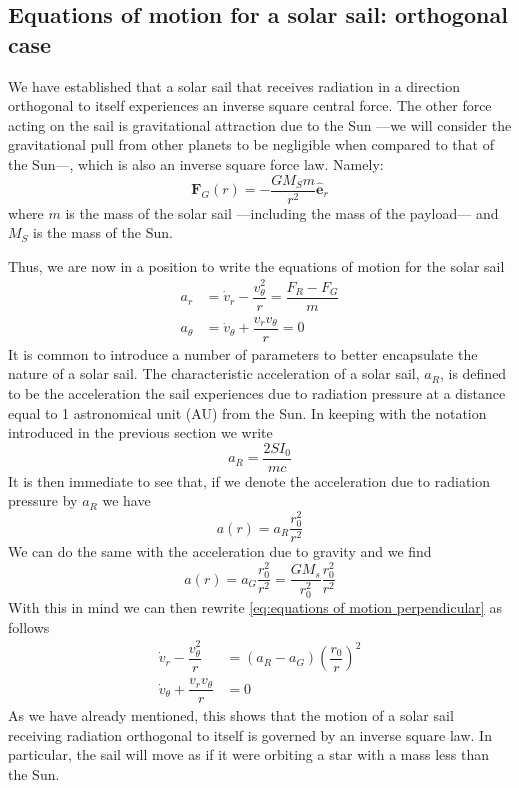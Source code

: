 \documentclass[twocolumn,12pt,a4paper]{article}
\numberwithin{equation}{section}
\begin{document}
\subsection{Equations of motion for a solar sail: orthogonal case}
We have established that a solar sail that receives radiation in a direction orthogonal to itself experiences an inverse square central force. The other force acting on the sail is gravitational attraction due to the Sun ---we will consider the gravitational pull from other planets to be negligible when compared to that of the Sun---, which is also an inverse square force law. Namely:
\begin{equation}
 	\mathbf{F}_G(r) = -\dfrac{G M_S m}{r^2} \mathbf{\hat{e}}_r \label{eq:gravitational force}
\end{equation}
where \( m \) is the mass of the solar sail ---including the mass of the payload--- and \( M_S \) is the mass of the Sun.

Thus, we are now in a position to write the equations of motion for the solar sail
\begin{align}
	a_{r} &= \dot{v}_r - \dfrac{v_{\theta}^2}{r} = \dfrac{F_R - F_G}{m} \label{eq:equations of motion perpendicular} \\
	a_{\theta} &= \dot{v}_{\theta} + \dfrac{v_r v_{\theta}}{r} = 0 
\end{align}
It is common to introduce a number of parameters to better encapsulate the nature of a solar sail. The characteristic acceleration of a solar sail, \( a_R \), is defined to be the acceleration the sail experiences due to radiation pressure at a distance equal to 1 astronomical unit (AU) from the Sun. In keeping with the notation introduced in the previous section we write
\begin{equation}
  a_R = \dfrac{2SI_0}{mc}
\end{equation}
It is then immediate to see that, if we denote the acceleration due to radiation pressure by \( a_R \) we have
\begin{equation}
  a(r) = a_R \dfrac{r_0^2}{r^2} 
\end{equation}
We can do the same with the acceleration due to gravity and we find
\begin{equation}
  a(r) = a_G \dfrac{r_0^2}{r^2} = \dfrac{G M_s}{r_0^2} \dfrac{r_0^2}{r^2}
\end{equation}
With this in mind we can then rewrite \autoref{eq:equations of motion perpendicular} as follows
\begin{align} \label{eq:equations of motion characteristic accelerations}
  \dot{v}_r - \dfrac{v_{\theta}^2}{r} &= (a_R - a_G) \left(\dfrac{r_0}{r}\right)^2 \\
	\dot{v}_{\theta} + \dfrac{v_r v_{\theta}}{r} &= 0
\end{align}
As we have already mentioned, this shows that the motion of a solar sail receiving radiation orthogonal to itself is governed by an inverse square law. In particular, the sail will move as if it were orbiting a star with a mass less than the Sun.
\end{document}
